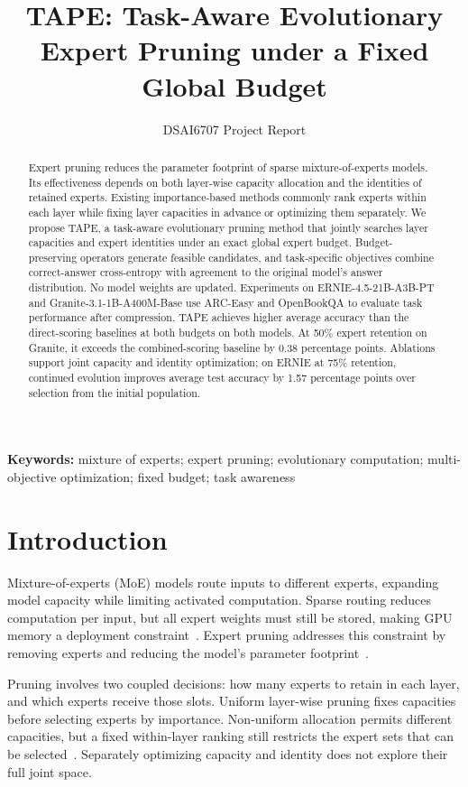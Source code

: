 \documentclass{article}
\title{TAPE: Task-Aware Evolutionary Expert Pruning under a Fixed Global Budget}
\author{DSAI6707 Project Report}
\begin{document}
\maketitle

\begin{abstract}
Expert pruning reduces the parameter footprint of sparse mixture-of-experts models. Its effectiveness depends on both layer-wise capacity allocation and the identities of retained experts. Existing importance-based methods commonly rank experts within each layer while fixing layer capacities in advance or optimizing them separately. We propose TAPE, a task-aware evolutionary pruning method that jointly searches layer capacities and expert identities under an exact global expert budget. Budget-preserving operators generate feasible candidates, and task-specific objectives combine correct-answer cross-entropy with agreement to the original model's answer distribution. No model weights are updated. Experiments on ERNIE-4.5-21B-A3B-PT and Granite-3.1-1B-A400M-Base use ARC-Easy and OpenBookQA to evaluate task performance after compression. TAPE achieves higher average accuracy than the direct-scoring baselines at both budgets on both models. At 50\% expert retention on Granite, it exceeds the combined-scoring baseline by 0.38 percentage points. Ablations support joint capacity and identity optimization; on ERNIE at 75\% retention, continued evolution improves average test accuracy by 1.57 percentage points over selection from the initial population.
\end{abstract}

\noindent\textbf{Keywords:} mixture of experts; expert pruning; evolutionary computation; multi-objective optimization; fixed budget; task awareness

\section{Introduction}
\label{sec:1}
Mixture-of-experts (MoE) models route inputs to different experts, expanding model capacity while limiting activated computation. Sparse routing reduces computation per input, but all expert weights must still be stored, making GPU memory a deployment constraint~\citep{ref1,ref3}. Expert pruning addresses this constraint by removing experts and reducing the model's parameter footprint~\citep{ref2,ref1}.

Pruning involves two coupled decisions: how many experts to retain in each layer, and which experts receive those slots. Uniform layer-wise pruning fixes capacities before selecting experts by importance. Non-uniform allocation permits different capacities, but a fixed within-layer ranking still restricts the expert sets that can be selected~\citep{ref17}. Separately optimizing capacity and identity does not explore their full joint space.
\end{document}

